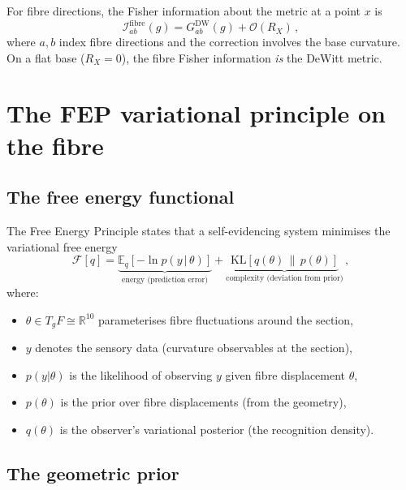 \documentclass[12pt, a4paper]{article}
\theoremstyle{definition}
\theoremstyle{remark}
\newcommand{\R}{\mathbb{R}}
\newcommand{\KL}{\mathrm{KL}}
\begin{document}
For fibre directions, the Fisher information about the metric at a point $x$ is
\begin{equation}
\label{eq:fibre_fisher}
\mathcal{I}_{ab}^{\mathrm{fibre}}(g) = G^{\mathrm{DW}}_{ab}(g) + \mathcal{O}(R_X)\,,
\end{equation}
where $a, b$ index fibre directions and the correction involves the base curvature.
On a flat base ($R_X = 0$), the fibre Fisher information \emph{is} the DeWitt metric.


\section{The FEP variational principle on the fibre}
\label{sec:fep}

\subsection{The free energy functional}

The Free Energy Principle states that a self-evidencing system minimises the variational free energy
\begin{equation}
\label{eq:FEP}
\mathcal{F}[q] = \underbrace{\mathbb{E}_q\!\left[-\ln p(y \,|\, \theta)\right]}_{\text{energy (prediction error)}} + \underbrace{\KL\!\left[q(\theta) \,\|\, p(\theta)\right]}_{\text{complexity (deviation from prior)}}\,,
\end{equation}
where:
\begin{itemize}[nosep]
\item $\theta \in T_g F \cong \R^{10}$ parameterises fibre fluctuations around the section,
\item $y$ denotes the sensory data (curvature observables at the section),
\item $p(y|\theta)$ is the likelihood of observing $y$ given fibre displacement $\theta$,
\item $p(\theta)$ is the prior over fibre displacements (from the geometry),
\item $q(\theta)$ is the observer's variational posterior (the recognition density).
\end{itemize}

\subsection{The geometric prior}
\label{sec:prior}
\end{document}
